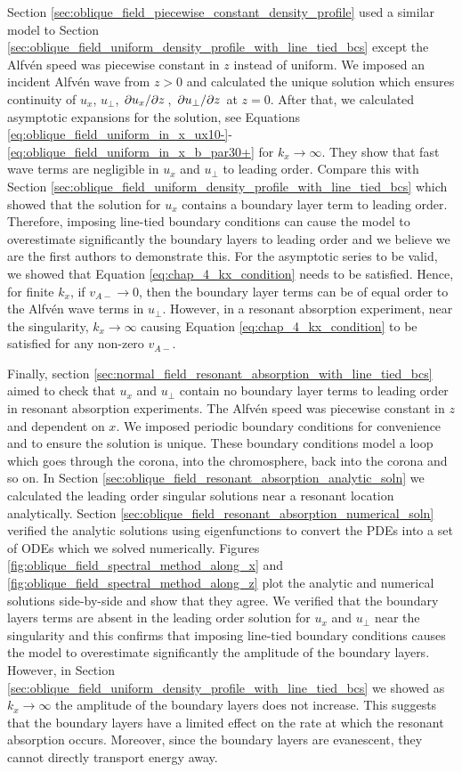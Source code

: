 Section \ref{sec:oblique_field_piecewise_constant_density_profile} used a similar model to Section \ref{sec:oblique_field_uniform_density_profile_with_line_tied_bcs} except the Alfv\'en speed was piecewise constant in $z$ instead of uniform. We imposed an incident Alfv\'en wave from $z>0$ and calculated the unique solution which ensures continuity of $u_x$, $u_\perp$, $\pdv*{u_x}{z}$, $\pdv*{u_\perp}{z}$ at $z=0$. After that, we calculated asymptotic expansions for the solution, see Equations \eqref{eq:oblique_field_uniform_in_x_ux10-}-\eqref{eq:oblique_field_uniform_in_x_b_par30+} for $k_x\rightarrow\infty$. They show that fast wave terms are negligible in $u_x$ and $u_\perp$ to leading order. Compare this with Section \ref{sec:oblique_field_uniform_density_profile_with_line_tied_bcs} which showed that the solution for $u_x$ contains a boundary layer term to leading order. Therefore, imposing line-tied boundary conditions can cause the model to overestimate significantly the boundary layers to leading order and we believe we are the first authors to demonstrate this. For the asymptotic series to be valid, we showed that Equation \eqref{eq:chap_4_kx_condition} needs to be satisfied. Hence, for finite $k_x$, if $v_{A-}\rightarrow0$, then the boundary layer terms can be of equal order to the Alfv\'en wave terms in $u_\perp$. However, in a resonant absorption experiment, near the singularity, $k_x\rightarrow \infty$ causing Equation \eqref{eq:chap_4_kx_condition} to be satisfied for any non-zero $v_{A-}$.

Finally, section \ref{sec:normal_field_resonant_absorption_with_line_tied_bcs} aimed to check that $u_x$ and $u_\perp$ contain no boundary layer terms to leading order in resonant absorption experiments. The Alfv\'en speed was piecewise constant in $z$ and dependent on $x$. We imposed periodic boundary conditions for convenience and to ensure the solution is unique. These boundary conditions model a loop which goes through the corona, into the chromosphere, back into the corona and so on. In Section \ref{sec:oblique_field_resonant_absorption_analytic_soln} we calculated the leading order singular solutions near a resonant location analytically. Section \ref{sec:oblique_field_resonant_absorption_numerical_soln} verified the analytic solutions using eigenfunctions to convert the PDEs into a set of ODEs which we solved numerically. Figures \ref{fig:oblique_field_spectral_method_along_x} and \ref{fig:oblique_field_spectral_method_along_z} plot the analytic and numerical solutions side-by-side and show that they agree. We verified that the boundary layers terms are absent in the leading order solution for $u_x$ and $u_\perp$ near the singularity and this confirms that imposing line-tied boundary conditions causes the model to overestimate significantly the amplitude of the boundary layers. However, in Section \ref{sec:oblique_field_uniform_density_profile_with_line_tied_bcs} we showed as $k_x\rightarrow\infty$ the amplitude of the boundary layers does not increase. This suggests that the boundary layers have a limited effect on the rate at which the resonant absorption occurs. Moreover, since the boundary layers are evanescent, they cannot directly transport energy away.

